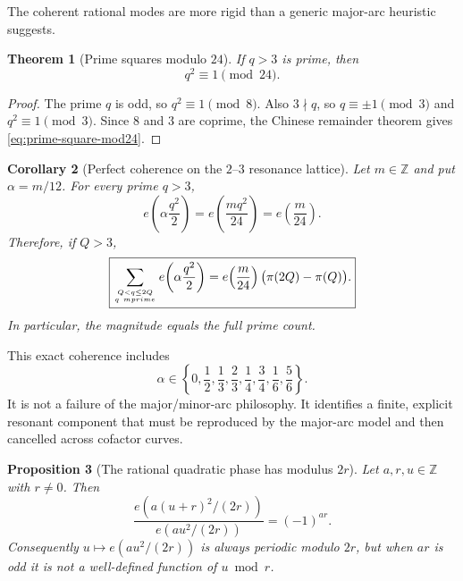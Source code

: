 \documentclass[11pt]{article}
\newtheorem{theorem}{Theorem}[section]
\newtheorem{proposition}[theorem]{Proposition}
\newtheorem{corollary}[theorem]{Corollary}
\theoremstyle{definition}
\theoremstyle{remark}
\newcommand{\1}{\mathbf{1}}
\begin{document}
The coherent rational modes are more rigid than a generic major-arc heuristic suggests.

\begin{theorem}[Prime squares modulo $24$]
\label{thm:prime-square-mod24}
If $q>3$ is prime, then
\begin{equation}
 \boxed{q^2\equiv1\pmod{24}.}
 \label{eq:prime-square-mod24}
\end{equation}
\end{theorem}

\begin{proof}
The prime $q$ is odd, so $q^2\equiv1\pmod8$.  Also $3\nmid q$, so
$q\equiv\pm1\pmod3$ and $q^2\equiv1\pmod3$.  Since $8$ and $3$ are coprime,
the Chinese remainder theorem gives \cref{eq:prime-square-mod24}.
\end{proof}

\begin{corollary}[Perfect coherence on the $2$--$3$ resonance lattice]
\label{cor:perfect-prime-coherence}
Let $m\in\mathbb Z$ and put $\alpha=m/12$.  For every prime $q>3$,
\begin{equation}
 e\!\left(\alpha\frac{q^2}{2}\right)
 =e\!\left(\frac{m q^2}{24}\right)
 =e\!\left(\frac m{24}\right).
 \label{eq:perfect-prime-phase}
\end{equation}
Therefore, if $Q>3$,
\begin{equation}
 \boxed{
 \sum_{Q<q\le2Q\atop q\ {
m prime}}
 e\!\left(\alpha\frac{q^2}{2}\right)
 =e\!\left(\frac m{24}\right)
 \bigl(\pi(2Q)-\pi(Q)\bigr).
 }
 \label{eq:perfect-prime-sum}
\end{equation}
In particular, the magnitude equals the full prime count.
\end{corollary}

This exact coherence includes
\[
 \alpha\in\left\{0,\frac12,\frac13,\frac23,\frac14,\frac34,
 \frac16,\frac56\right\}.
\]
It is not a failure of the major/minor-arc philosophy.  It identifies a finite,
explicit resonant component that must be reproduced by the major-arc model and then
cancelled across cofactor curves.

\begin{proposition}[The rational quadratic phase has modulus $2r$]
\label{prop:phase-modulus-two-r}
Let $a,r,u\in\mathbb Z$ with $r\ne0$.  Then
\begin{equation}
 \frac{e\!\left(a(u+r)^2/(2r)\right)}
      {e\!\left(au^2/(2r)\right)}
 =(-1)^{ar}.
 \label{eq:phase-shift-r}
\end{equation}
Consequently $u\mapsto e(au^2/(2r))$ is always periodic modulo $2r$, but when
$ar$ is odd it is not a well-defined function of $u\bmod r$.
\end{proposition}
\end{document}
